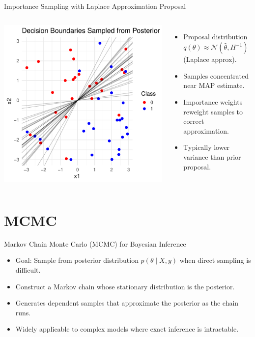 \documentclass{beamer}
\begin{document}
\begin{frame}{Importance Sampling with Laplace Approximation Proposal}
\begin{columns}
  \centering
  \includegraphics[width=\textwidth]{importance_sampling_from_laplace.pdf}

  \small
  \begin{itemize}
    \item Proposal distribution \( q(\theta) \approx \mathcal{N}(\hat{\theta}, H^{-1}) \) (Laplace approx).
    \item Samples concentrated near MAP estimate.
    \item Importance weights reweight samples to correct approximation.
    \item Typically lower variance than prior proposal.
  \end{itemize}
\end{columns}
\end{frame}

\section{MCMC}

\begin{frame}{Markov Chain Monte Carlo (MCMC) for Bayesian Inference}
\begin{itemize}
  \item Goal: Sample from posterior distribution \(p(\theta \mid X, y)\) when direct sampling is difficult.
  \item Construct a Markov chain whose stationary distribution is the posterior.
  \item Generates dependent samples that approximate the posterior as the chain runs.
  \item Widely applicable to complex models where exact inference is intractable.
\end{itemize}
\end{frame}
\end{document}

